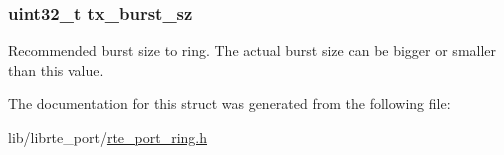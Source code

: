 \subsubsection[{tx\+\_\+burst\+\_\+sz}]{\setlength{\rightskip}{0pt plus 5cm}uint32\+\_\+t tx\+\_\+burst\+\_\+sz}\label{structrte__port__ring__writer__params_a9ed7dbe6241b97c9b68a9491e77c84d0}
Recommended burst size to ring. The actual burst size can be bigger or smaller than this value. 

The documentation for this struct was generated from the following file\+:\begin{DoxyCompactItemize}
\item 
lib/librte\+\_\+port/\hyperlink{rte__port__ring_8h}{rte\+\_\+port\+\_\+ring.\+h}\end{DoxyCompactItemize}
